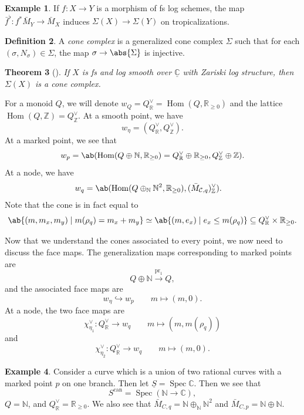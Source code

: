 \documentclass{amsart}
\newtheorem{thm}{Theorem}[section]
\theoremstyle{definition}
\newtheorem{defn}[thm]{Definition}
\newtheorem{exm}[thm]{Example}
\theoremstyle{remark}
\theoremstyle{plain}
\theoremstyle{definition}
\theoremstyle{remark}
\newcommand{\N}{\mathbb{N}}
\newcommand{\R}{\mathbb{R}}
\newcommand{\C}{\mathbb{C}}
\newcommand{\Z}{\mathbb{Z}}
\newcommand{\mc}[1]{\mathcal{#1}}
\newcommand{\on}[1]{\operatorname{#1}}
\newcommand{\ul}[1]{\underline{#1}}
\newcommand{\1}{\mathbf{1}}
\newcommand{\2}{\mathbf{2}}
\newcommand{\3}{\mathbf{3}}
\DeclareMathOperator{\Hom}{Hom}
\DeclareMathOperator{\Spec}{Spec}
\begin{document}
\begin{exm}
    If \(f \colon X \to Y\) is a morphism of fs log schemes, the map \(\bar{f}^{\flat} \colon f^* \bar{M}_Y \to \bar{M}_X\) induces \(\Sigma(X) \to \Sigma(Y)\) on tropicalizations.
\end{exm}

\begin{defn}
    A \textit{cone complex} is a generalized cone complex \(\Sigma\) such that for each \((\sigma, N_{\sigma}) \in \Sigma\), the map \(\sigma \to \abs{\Sigma}\) is injective.
\end{defn}

\begin{thm}[{\cite{ACP2015}}]
    If \(X\) is fs and log smooth over \(\ul{\C}\) with Zariski log structure, then \(\Sigma(X)\) is a cone complex.
\end{thm}

For a monoid \(Q\), we will denote \(w_Q = Q_{\R}^{\vee} = \Hom(Q, \R_{\geq 0})\) and the lattice \(\Hom(Q, \Z) = Q_{\Z}^{\vee}\). At a smooth point, we have
\[ w_{\eta} = (Q_{\R}^{\vee}, Q_{\Z}^{\vee}). \]
At a marked point, we see that
\[ w_p = \ab(\Hom (Q \oplus \N, \R_{\geq 0}) = Q_{\R}^{\vee} \oplus \R_{\geq 0}, Q_{\Z}^{\vee}\oplus \Z). \]
At a node, we have
\begin{align*}
    w_q &= \ab(\Hom(Q \oplus_{\N} \N^2, \R_{\geq 0}), ( \bar{M}_{\mc{C}, q} )_{\Z}^{\vee}).
\end{align*}
Note that the cone is in fact equal to
\[ \ab\{(m, m_x, m_y) \mid m(\rho_q) = m_x + m_y \} \simeq \ab\{(m, e_x) \mid e_x \leq m(\rho_q) \} \subseteq Q_{\R}^{\vee} \times \R_{\geq 0}. \]

Now that we understand the cones associated to every point, we now need to discuss the face maps. The generalization maps corresponding to marked points are
\[ Q \oplus \N \xrightarrow{\on{pr}_1} Q, \]
and the associated face maps are 
\[ w_{\eta} \hookrightarrow w_p \qquad m \mapsto (m,0). \]
At a node, the two face maps are
\[ \chi_{\eta_1}^{\vee} \colon Q_{\R}^{\vee} \to w_q \qquad m \mapsto (m, m(\rho_q)) \]
and 
\[ \chi_{\eta_2}^{\vee} \colon Q_{\R}^{\vee} \to w_q \qquad m \mapsto (m, 0). \]

\begin{exm}
    Consider a curve which is a union of two rational curves with a marked point \(p\) on one branch. Then let \(\ul{S} = \Spec \C\). Then we see that
    \[ S^{\on{can}} = \Spec(\N \to \C), \]
    \(Q = \N\), and \(Q_{\R}^{\vee} = \R_{\geq 0}\). We also see that \(\bar{M}_{C, q} = \N \oplus_{\N} \N^2\) and \(\bar{M}_{C, p} = \N \oplus \N\).
\end{exm}
\end{document}
